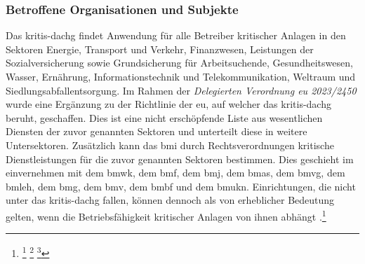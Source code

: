 \documentclass[11pt,a4paper,hidelinks]{article}   %
\begin{document}
                \subsubsection{Betroffene Organisationen und Subjekte}
                Das \gls{kritis-dachg} findet Anwendung für alle Betreiber kritischer Anlagen in den Sektoren Energie, Transport und Verkehr, Finanzwesen, Leistungen der Sozialversicherung sowie Grundsicherung für Arbeitsuchende, Gesundheitswesen, Wasser, Ernährung, Informationstechnik und Telekommunikation, Weltraum und Siedlungsabfallentsorgung. Im Rahmen der \emph{Delegierten Verordnung \gls{eu} 2023/2450} wurde eine Ergänzung zu der Richtlinie der \gls{eu}, auf welcher das \gls{kritis-dachg} beruht, geschaffen. Dies ist eine nicht erschöpfende Liste aus wesentlichen Diensten der zuvor genannten Sektoren und unterteilt diese in weitere Untersektoren. Zusätzlich kann das \gls{bmi} durch Rechtsverordnungen kritische Dienstleistungen für die zuvor genannten Sektoren bestimmen. Dies geschieht im einvernehmen mit dem \gls{bmwk}, dem \gls{bmf}, dem \gls{bmj}, dem \gls{bmas}, dem \gls{bmvg}, dem \gls{bmleh}, dem \gls{bmg}, dem \gls{bmv}, dem \gls{bmbf} und dem \gls{bmukn}. Einrichtungen, die nicht unter das \gls{kritis-dachg} fallen, können dennoch als von erheblicher Bedeutung gelten, wenn die Betriebsfähigkeit kritischer Anlagen von ihnen abhängt .\footnote{
                    \footcite[Vgl. §4, Absatz 1,][]{KRITIS-DachG}
                    \footcite[Vgl. §4, Absatz 3 \& 4,][]{KRITIS-DachG}
                    \footcite[Vgl. Artikel 2, Nummer 1,][]{EU2023-2450}
                }
\end{document}
